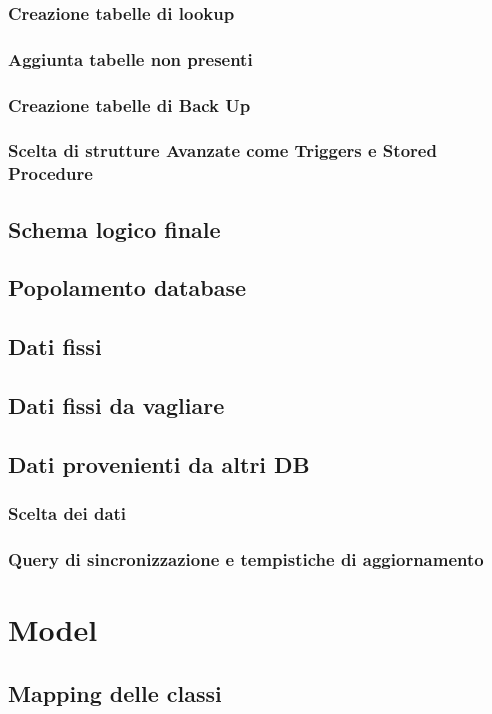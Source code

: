 \documentclass[12pt, a4paper]{article}
\begin{document}
\subsubsection{Creazione tabelle di lookup}
\subsubsection{Aggiunta tabelle non presenti}
\subsubsection{Creazione tabelle di Back Up}
\subsubsection{Scelta di strutture Avanzate come Triggers e Stored Procedure}

\subsection{Schema logico finale}
\subsection{Popolamento database}
\subsection{Dati fissi}
\subsection{Dati fissi da vagliare}
\subsection{Dati provenienti da altri DB}
\subsubsection{Scelta dei dati}
\subsubsection{Query di sincronizzazione e tempistiche di aggiornamento}

\newpage
\section{Model}
\subsection{Mapping delle classi}
\end{document}
